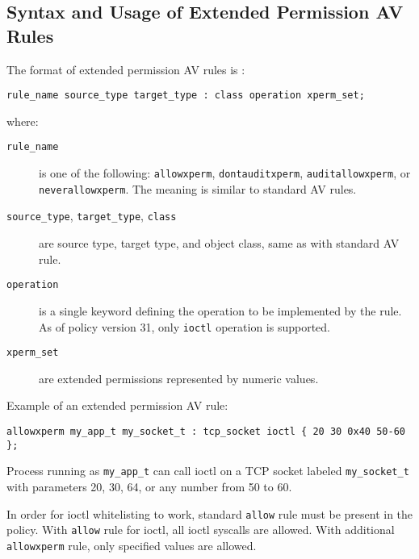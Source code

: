 \subsection{Syntax and Usage of Extended Permission AV Rules}
The format of extended permission AV rules is \cite{xpermrules}:
\begin{lstlisting}
rule_name source_type target_type : class operation xperm_set;
\end{lstlisting}
where:
\begin{description}
    \item [\texttt{rule\_name}] is one of the following: \texttt{allowxperm},
        \texttt{dontauditxperm}, \texttt{auditallowxperm}, or
        \texttt{neverallowxperm}. The meaning is similar to standard AV rules.
    \item [\texttt{source\_type}, \texttt{target\_type}, \texttt{class}] are
        source type, target type, and object class, same as with standard AV
        rule.
    \item [\texttt{operation}] is a single keyword defining the operation to be
        implemented by the rule. As of policy version 31, only \texttt{ioctl}
        operation is supported.
    \item [\texttt{xperm\_set}] are extended permissions represented by numeric
        values.
\end{description}

Example of an extended permission AV rule:
\begin{lstlisting}
allowxperm my_app_t my_socket_t : tcp_socket ioctl { 20 30 0x40 50-60 };
\end{lstlisting}

Process running as \texttt{my\_app\_t} can call ioctl on a TCP socket labeled
\texttt{my\_socket\_t} with parameters 20, 30, 64, or any number from 50 to 60.

In order for ioctl whitelisting to work, standard \texttt{allow} rule must be
present in the policy. With \texttt{allow} rule for ioctl, all ioctl syscalls
are allowed. With additional \texttt{allowxperm} rule, only specified values are
allowed.

